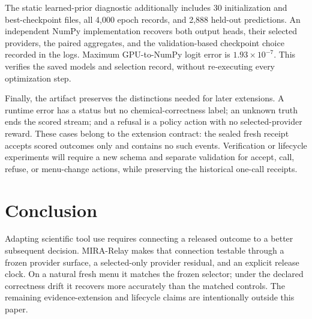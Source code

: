 \documentclass[sigconf,anonymous]{aamas}
\begin{document}
The static learned-prior diagnostic additionally includes 30 initialization and best-checkpoint files, all 4,000 epoch records, and 2,888 held-out predictions. An independent NumPy implementation recovers both output heads, their selected providers, the paired aggregates, and the validation-based checkpoint choice recorded in the logs. Maximum GPU-to-NumPy logit error is $1.93\times10^{-7}$. This verifies the saved models and selection record, without re-executing every optimization step.

Finally, the artifact preserves the distinctions needed for later extensions. A runtime error has a status but no chemical-correctness label; an unknown truth ends the scored stream; and a refusal is a policy action with no selected-provider reward. These cases belong to the extension contract: the sealed fresh receipt accepts scored outcomes only and contains no such events. Verification or lifecycle experiments will require a new schema and separate validation for accept, call, refuse, or menu-change actions, while preserving the historical one-call receipts.

\section{Conclusion}
Adapting scientific tool use requires connecting a released outcome to a better subsequent decision. MIRA-Relay makes that connection testable through a frozen provider surface, a selected-only provider residual, and an explicit release clock. On a natural fresh menu it matches the frozen selector; under the declared correctness drift it recovers more accurately than the matched controls. The remaining evidence-extension and lifecycle claims are intentionally outside this paper.

\clearpage
\balance


\end{document}
